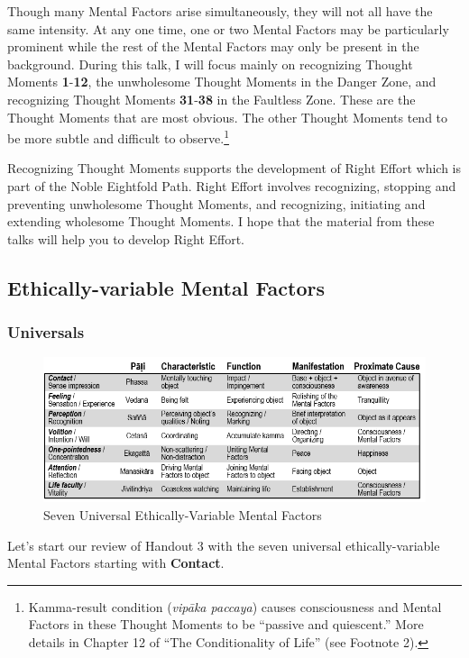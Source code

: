 Though many Mental Factors arise simultaneously, they will not all have the same intensity. At any one time, one or two Mental Factors may be particularly prominent while the rest of the Mental Factors may only be present in the background. During this talk, I will focus mainly on recognizing Thought Moments \textbf{1}-\textbf{12}, the unwholesome Thought Moments in the Danger Zone, and recognizing Thought Moments \textbf{31}-\textbf{38} in the Faultless Zone. These are the Thought Moments that are most obvious. The other Thought Moments tend to be more subtle and difficult to observe.\footnote{Kamma-result condition (\textit{vipāka paccaya}) causes consciousness and Mental Factors in these Thought Moments to be “passive and quiescent.” More details in Chapter 12 of “The Conditionality of Life” (see Footnote 2).}

Recognizing Thought Moments supports the development of Right Effort which is part of the Noble Eightfold Path. Right Effort involves recognizing, stopping and preventing unwholesome Thought Moments, and recognizing, initiating and extending wholesome Thought Moments. I hope that the material from these talks will help you to develop Right Effort.

\subsection*{Ethically-variable Mental Factors}

\subsubsection*{Universals}

\begin{figure}[h]
\centering
\includegraphics[width=0.8\linewidth]{./Diagrams/U-E}
\caption{Seven Universal Ethically-Variable Mental Factors}
\label{fig:U-E}
\end{figure}

Let’s start our review of Handout 3 with the seven universal ethically-variable Mental Factors starting with \textbf{Contact}.

